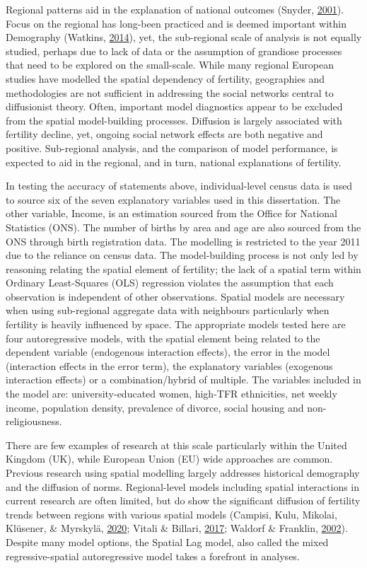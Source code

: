 \documentclass[12pt,twoside]{reedthesis}
\begin{document}
Regional patterns aid in the explanation of national outcomes (Snyder, \protect\hyperlink{ref-snyder2001}{2001}). Focus on the regional has long-been practiced and is deemed important within Demography (Watkins, \protect\hyperlink{ref-watkins2014}{2014}), yet, the sub-regional scale of analysis is not equally studied, perhaps due to lack of data or the assumption of grandiose processes that need to be explored on the small-scale. While many regional European studies have modelled the spatial dependency of fertility, geographies and methodologies are not sufficient in addressing the social networks central to diffusionist theory. Often, important model diagnostics appear to be excluded from the spatial model-building processes. Diffusion is largely associated with fertility decline, yet, ongoing social network effects are both negative and positive. Sub-regional analysis, and the comparison of model performance, is expected to aid in the regional, and in turn, national explanations of fertility.

In testing the accuracy of statements above, individual-level census data is used to source six of the seven explanatory variables used in this dissertation. The other variable, Income, is an estimation sourced from the Office for National Statistics (ONS). The number of births by area and age are also sourced from the ONS through birth registration data. The modelling is restricted to the year 2011 due to the reliance on census data. The model-building process is not only led by reasoning relating the spatial element of fertility; the lack of a spatial term within Ordinary Least-Squares (OLS) regression violates the assumption that each observation is independent of other observations. Spatial models are necessary when using sub-regional aggregate data with neighbours particularly when fertility is heavily influenced by space. The appropriate models tested here are four autoregressive models, with the spatial element being related to the dependent variable (endogenous interaction effects), the error in the model (interaction effects in the error term), the explanatory variables (exogenous interaction effects) or a combination/hybrid of multiple. The variables included in the model are: university-educated women, high-TFR ethnicities, net weekly income, population density, prevalence of divorce, social housing and non-religiousness.

There are few examples of research at this scale particularly within the United Kingdom (UK), while European Union (EU) wide approaches are common. Previous research using spatial modelling largely addresses historical demography and the diffusion of norms. Regional-level models including spatial interactions in current research are often limited, but do show the significant diffusion of fertility trends between regions with various spatial models (Campisi, Kulu, Mikolai, Klüsener, \& Myrskylä, \protect\hyperlink{ref-campisi2020}{2020}; Vitali \& Billari, \protect\hyperlink{ref-vitali2017}{2017}; Waldorf \& Franklin, \protect\hyperlink{ref-waldorf2002}{2002}). Despite many model options, the Spatial Lag model, also called the mixed regressive-spatial autoregressive model takes a forefront in analyses.
\end{document}
